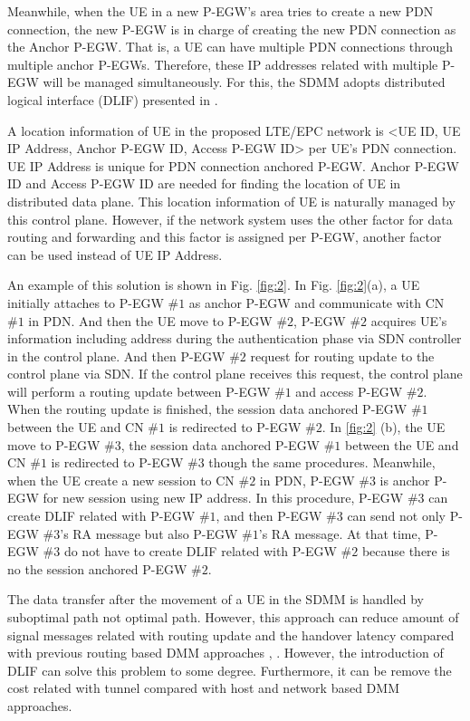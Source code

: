 \documentclass[runningheads,a4paper]{llncs}
\begin{document}
Meanwhile, when the UE in a new P-EGW's area tries to create a new PDN connection, the new P-EGW is in charge of creating the new PDN connection as the Anchor P-EGW. That is, a UE can have multiple PDN connections through multiple anchor P-EGWs. Therefore, these IP addresses related with multiple P-EGW will be managed simultaneously. For this, the SDMM adopts distributed logical interface (DLIF) presented in \cite{ref10}.

A location information of UE in the proposed LTE/EPC network is <UE ID, UE IP Address, Anchor P-EGW ID, Access P-EGW ID> per UE's PDN connection. UE IP Address is unique for PDN connection anchored P-EGW. Anchor P-EGW ID and Access P-EGW ID are needed for finding the location of UE in distributed data plane. This location information of UE is naturally managed by this control plane. However, if the network system uses the other factor for data routing and forwarding and this factor is assigned per P-EGW, another factor can be used instead of UE IP Address.

An example of this solution is shown in Fig. \ref{fig:2}. In Fig. \ref{fig:2}(a), a UE initially attaches to P-EGW $\#1$ as anchor P-EGW and communicate with CN $\#1$ in PDN. And then the UE move to P-EGW $\#2$, P-EGW $\#2$ acquires UE's information including address during the authentication phase via SDN controller in the control plane. And then P-EGW $\#2$ request for routing update to the control plane via SDN. If the control plane receives this request, the control plane will perform a routing update between P-EGW $\#1$ and access P-EGW $\#2$. When the routing update is finished, the session data anchored P-EGW $\#1$ between the UE and CN $\#1$ is redirected to P-EGW $\#2$. In \ref{fig:2} (b), the UE move to P-EGW $\#3$, the session data anchored P-EGW $\#1$ between the UE and CN $\#1$ is redirected to P-EGW $\#3$ though the same procedures. Meanwhile, when the UE create a new session to CN $\#2$ in PDN, P-EGW $\#3$ is anchor P-EGW for new session using new IP address. In this procedure, P-EGW $\#3$ can create DLIF related with P-EGW $\#1$, and then P-EGW $\#3$ can send not only P-EGW $\#3$'s RA message but also P-EGW $\#1$'s RA message. At that time, P-EGW $\#3$ do not have to create DLIF related with P-EGW $\#2$ because there is no the session anchored P-EGW $\#2$.

The data transfer after the movement of a UE in the SDMM is handled by suboptimal path not optimal path. However, this approach can reduce amount of signal messages related with routing update and the handover latency compared with previous routing based DMM approaches \cite{ref11}, \cite{ref12}. However, the introduction of DLIF can solve this problem to some degree. Furthermore, it can be remove the cost related with tunnel compared with host and network based DMM approaches.
\end{document}
